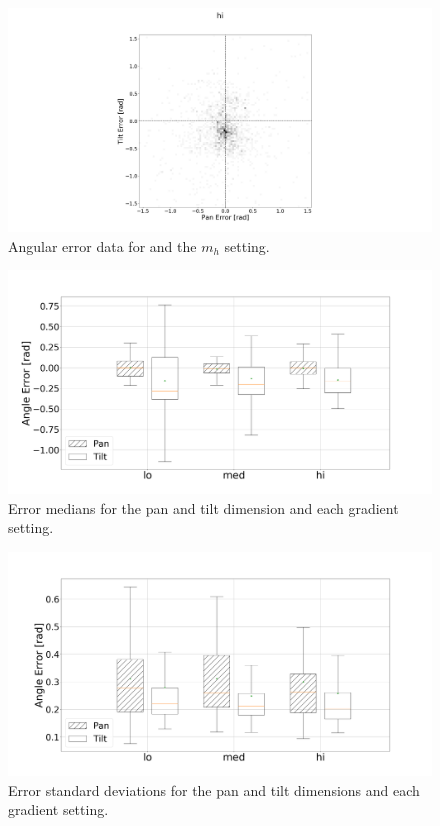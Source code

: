 \documentclass[sigconf, screen=true, anonymous=true]{acmart}
\begin{document}
\begin{figure}
  \centering
  \includegraphics[clip, trim=450 0 450 110, width=0.8\columnwidth]{figures/err_hi.png}
  \caption{Angular error data for and the $m_h$ setting. }\label{fig:err-results-hi}
\end{figure}

\begin{figure}
  \centering
  \includegraphics[clip, trim=20 -70 100 100, width=1.0\columnwidth]{figures/err_boxplot_medians.png}
  \caption{Error medians for the pan and tilt dimension and each gradient setting.} \label{fig:err-boxplot-median}
\end{figure}

\begin{figure}
  \centering
  \includegraphics[clip, trim=80 -70 100 0, width=1.0\columnwidth]{figures/err_boxplot_std.png}
  \caption{Error standard deviations for the pan and tilt dimensions and each gradient setting.}\label{fig:err-boxplot-std}
\end{figure}
\end{document}
